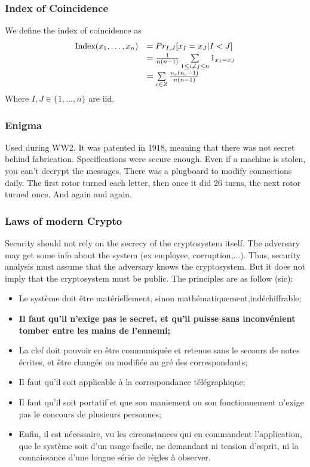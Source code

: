 \documentclass[11pt,a4paper]{article}
\begin{document}
\subsubsection{Index of Coincidence}
We define the index of coincidence as
\[\begin{array}{ll}
    \text{Index}(x_1,\ldots,x_n) &=  Pr_{I,J}[x_I = x_J | I < J]\\
    & = \frac{1}{n(n-1)}\sum\limits_{1\leq i\neq j \leq n}^{} 1_{x_I = x_J}\\
    & = \sum\limits_{c\in Z}^{} \frac{n_c(n_c-1)}{n(n-1)}
\end{array}\]
Where $I,J \in \{1,\ldots,n\}$ are iid.

\subsubsection{Enigma}
Used during WW2. It was patented in 1918, meaning that there was not secret behind fabrication. Specifications were secure enough. Even if a machine is stolen, you can't decrypt the messages. There was a plugboard to modify connections daily. The first rotor turned each letter, then once it did 26 turns, the next rotor turned once. And again and again.

\subsubsection{Laws of modern Crypto}
 Security should not rely on the secrecy of the cryptosystem itself. The adversary may get some info about the system (ex employee, corruption,...). Thus, security analysis must assume that the adversary knows the cryptosystem. But it does not imply that the cryptosystem must be public. The principles are as follow (sic):
\begin{itemize}
    \item Le système doit être matériellement, sinon mathématiquement,indéchiffrable;
    \item \textbf{Il faut qu’il n’exige pas le secret, et qu’il puisse sans inconvénient tomber entre les mains de l’ennemi;
    }
    \item La clef doit pouvoir en être communiquée et retenue sans le secours de notes écrites, et être changée ou modifiée au gré des correspondants;
    \item Il faut qu’il soit applicable à la correspondance télégraphique;
    \item Il faut qu’il soit portatif et que son maniement ou son fonctionnement n’exige pas le concours de plusieurs personnes;
    \item Enfin, il est nécessaire, vu les circonstances qui en commandent l’application, que le système soit d’un usage facile, ne demandant ni tension d’esprit, ni la connaissance d’une longue série de règles à observer.
\end{itemize}
\end{document}
